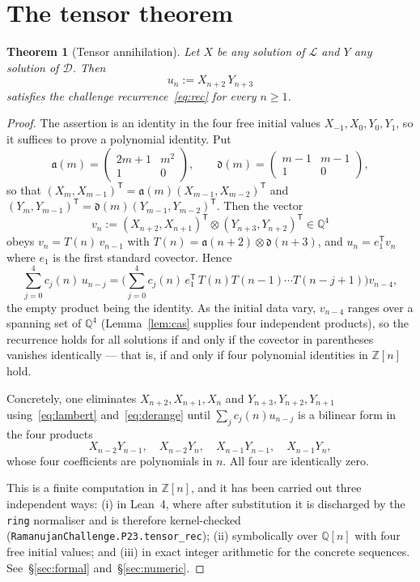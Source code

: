 \documentclass[11pt]{article}
\newtheorem{theorem}{Theorem}[section]
\theoremstyle{remark}
\begin{document}
\section{The tensor theorem}

\begin{theorem}[Tensor annihilation]\label{thm:tensor}
Let $X$ be \emph{any} solution of $\mathcal{L}$ and $Y$ \emph{any} solution of
$\mathcal{D}$. Then
\[
u_n := X_{n+2}\,Y_{n+3}
\]
satisfies the challenge recurrence~\eqref{eq:rec} for every $n\ge1$.
\end{theorem}

\begin{proof}
The assertion is an identity in the four free initial values
$X_{-1},X_0,Y_0,Y_1$, so it suffices to prove a polynomial identity. Put
\[
\mathfrak{a}(m) = \begin{pmatrix} 2m+1 & m^2\\ 1 & 0\end{pmatrix},
\qquad
\mathfrak{d}(m) = \begin{pmatrix} m-1 & m-1\\ 1 & 0\end{pmatrix},
\]
so that $(X_m,X_{m-1})^{\mathsf T} = \mathfrak{a}(m)(X_{m-1},X_{m-2})^{\mathsf T}$
and $(Y_m,Y_{m-1})^{\mathsf T} = \mathfrak{d}(m)(Y_{m-1},Y_{m-2})^{\mathsf T}$.
Then the vector
\[
v_n := (X_{n+2},X_{n+1})^{\mathsf T}\otimes(Y_{n+3},Y_{n+2})^{\mathsf T}\in\mathbb{Q}^4
\]
obeys $v_n = T(n)\,v_{n-1}$ with $T(n) = \mathfrak{a}(n+2)\otimes\mathfrak{d}(n+3)$,
and $u_n = e_1^{\mathsf T}v_n$ where $e_1$ is the first standard covector. Hence
\[
\sum_{j=0}^{4} c_j(n)\,u_{n-j}
= \Biggl(\sum_{j=0}^{4} c_j(n)\,e_1^{\mathsf T}\,T(n)T(n-1)\cdots T(n-j+1)\Biggr) v_{n-4},
\]
the empty product being the identity. As the initial data vary, $v_{n-4}$ ranges
over a spanning set of $\mathbb{Q}^4$ (Lemma~\ref{lem:cas} supplies four
independent products), so the recurrence holds for all solutions if and only if
the covector in parentheses vanishes identically --- that is, if and only if
four polynomial identities in $\mathbb{Z}[n]$ hold.

Concretely, one eliminates $X_{n+2},X_{n+1},X_n$ and $Y_{n+3},Y_{n+2},Y_{n+1}$
using~\eqref{eq:lambert} and~\eqref{eq:derange} until $\sum_j c_j(n)u_{n-j}$ is
a bilinear form in the four products
\[
X_{n-2}Y_{n-1},\quad X_{n-2}Y_{n},\quad X_{n-1}Y_{n-1},\quad X_{n-1}Y_{n},
\]
whose four coefficients are polynomials in $n$. All four are identically zero.

This is a finite computation in $\mathbb{Z}[n]$, and it has been carried out
three independent ways: (i) in Lean~4, where after substitution it is
discharged by the \texttt{ring} normaliser and is therefore kernel-checked
(\texttt{RamanujanChallenge.P23.tensor\_rec}); (ii) symbolically over
$\mathbb{Q}[n]$ with four free initial values; and (iii) in exact integer
arithmetic for the concrete sequences. See~\S\ref{sec:formal}
and~\S\ref{sec:numeric}.
\end{proof}
\end{document}
